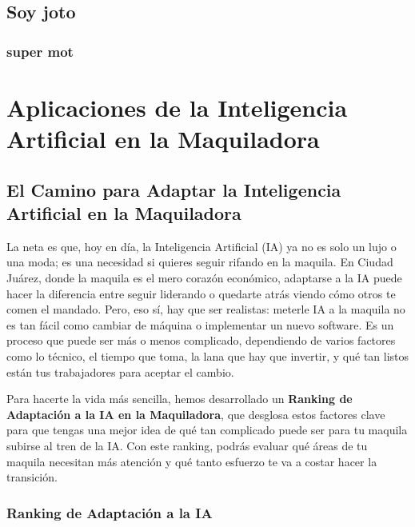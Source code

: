 \documentclass[
  10pt,
  letterpaper,
]{book}
\begin{document}
\section{Soy joto}\label{soy-joto}

\subsection{super mot}\label{super-mot}


\chapter{Aplicaciones de la Inteligencia Artificial en la
Maquiladora}\label{aplicaciones-de-la-inteligencia-artificial-en-la-maquiladora}

\section{El Camino para Adaptar la Inteligencia Artificial en la
Maquiladora}\label{el-camino-para-adaptar-la-inteligencia-artificial-en-la-maquiladora}

La neta es que, hoy en día, la Inteligencia Artificial (IA) ya no es
solo un lujo o una moda; es una necesidad si quieres seguir rifando en
la maquila. En Ciudad Juárez, donde la maquila es el mero corazón
económico, adaptarse a la IA puede hacer la diferencia entre seguir
liderando o quedarte atrás viendo cómo otros te comen el mandado. Pero,
eso sí, hay que ser realistas: meterle IA a la maquila no es tan fácil
como cambiar de máquina o implementar un nuevo software. Es un proceso
que puede ser más o menos complicado, dependiendo de varios factores
como lo técnico, el tiempo que toma, la lana que hay que invertir, y qué
tan listos están tus trabajadores para aceptar el cambio.

Para hacerte la vida más sencilla, hemos desarrollado un \textbf{Ranking
de Adaptación a la IA en la Maquiladora}, que desglosa estos factores
clave para que tengas una mejor idea de qué tan complicado puede ser
para tu maquila subirse al tren de la IA. Con este ranking, podrás
evaluar qué áreas de tu maquila necesitan más atención y qué tanto
esfuerzo te va a costar hacer la transición.

\subsection{Ranking de Adaptación a la
IA}\label{ranking-de-adaptaciuxf3n-a-la-ia}
\end{document}
